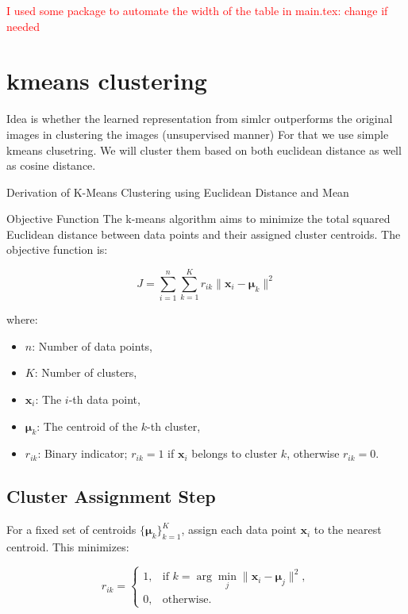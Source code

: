 \textcolor{red}{I used some package to automate the width of the table in main.tex: change if needed} 







\section{kmeans clustering}

Idea is whether the learned representation from simlcr outperforms the original images in clustering the images (unsupervised manner) For that we use simple kmeans 
clusetring. We will cluster them based on both euclidean distance as well as cosine distance.

Derivation of K-Means Clustering using Euclidean Distance and Mean

Objective Function
The k-means algorithm aims to minimize the total squared Euclidean distance between data points and their assigned cluster centroids. The objective function is:

\[
J = \sum_{i=1}^{n} \sum_{k=1}^{K} r_{ik} \| \mathbf{x}_i - \boldsymbol{\mu}_k \|^2
\]

where:
\begin{itemize}
    \item \( n \): Number of data points,
    \item \( K \): Number of clusters,
    \item \( \mathbf{x}_i \): The \( i \)-th data point,
    \item \( \boldsymbol{\mu}_k \): The centroid of the \( k \)-th cluster,
    \item \( r_{ik} \): Binary indicator; \( r_{ik} = 1 \) if \( \mathbf{x}_i \) belongs to cluster \( k \), otherwise \( r_{ik} = 0 \).
\end{itemize}

\subsection*{Cluster Assignment Step}
For a fixed set of centroids \( \{ \boldsymbol{\mu}_k \}_{k=1}^K \), assign each data point \( \mathbf{x}_i \) to the nearest centroid. This minimizes:

\[
r_{ik} =
\begin{cases} 
1, & \text{if } k = \arg\min_{j} \| \mathbf{x}_i - \boldsymbol{\mu}_j \|^2, \\
0, & \text{otherwise.}
\end{cases}
\]

